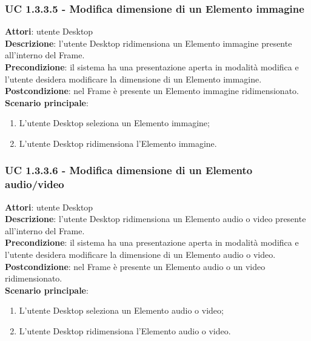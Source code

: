 \subsubsection{UC 1.3.3.5 - Modifica dimensione di un Elemento immagine}{
	\label{uc1.3.3.5}
	\textbf{Attori}: utente Desktop \\
	\textbf{Descrizione}: l'utente Desktop ridimensiona un Elemento immagine presente all'interno del Frame. \\
	\textbf{Precondizione}: il sistema ha una presentazione aperta in modalità modifica e l'utente desidera modificare la dimensione di un Elemento immagine.	\\
	\textbf{Postcondizione}: nel Frame è presente un Elemento immagine ridimensionato.	\\
	\textbf{Scenario principale}:
	\begin{enumerate}
		\item L'utente Desktop seleziona un Elemento immagine;
		\item L'utente Desktop ridimensiona l'Elemento immagine.
	\end{enumerate}
	}
\subsubsection{UC 1.3.3.6 - Modifica dimensione di un Elemento audio/video}{
	\label{uc1.3.3.6}
	\textbf{Attori}: utente Desktop \\
	\textbf{Descrizione}: l'utente Desktop ridimensiona un Elemento audio o video presente all'interno del Frame. \\
	\textbf{Precondizione}: il sistema ha una presentazione aperta in modalità modifica e l'utente desidera modificare la dimensione di un Elemento audio o video.	\\
	\textbf{Postcondizione}: nel Frame è presente un Elemento audio o un video ridimensionato.	\\
	\textbf{Scenario principale}:
	\begin{enumerate}
		\item L'utente Desktop seleziona un Elemento audio o video;
		\item L'utente Desktop ridimensiona l'Elemento audio o video.
	\end{enumerate}
	}
